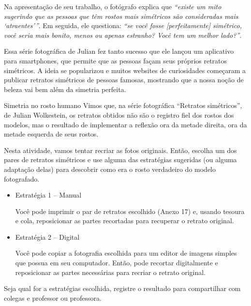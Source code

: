 Na apresentação de seu trabalho, o fotógrafo explica que \textit{“existe um mito sugerindo que as pessoas que têm rostos mais simétricos são consideradas mais ‘atraentes’”}. Em seguida, ele questiona: \textit{“se você fosse [perfeitamente] simétrico, você seria mais bonito, menos ou apenas estranho? Você tem um melhor lado?”}.

Essa série fotográfica de Julian fez tanto sucesso que ele lançou um aplicativo para smartphones, que permite que as pessoas façam seus próprios retratos simétricos. A ideia se popularizou e muitos websites de curiosidades começaram a publicar retratos simétricos de pessoas famosas, mostrando que a nossa noção de beleza vai bem além da simetria perfeita.

\begin{task}{Simetria no rosto humano}
Vimos que, na série fotográfica “Retratos simétricos”, de Julian Wolkestein, os retratos obtidos não são o registro fiel dos rostos dos modelos, mas o resultado de implementar a reflexão ora da metade direita, ora da metade esquerda de seus rostos. 

Nesta atividade, vamos tentar recriar as fotos originais.  Então, escolha um dos pares de retratos simétricos e use alguma das estratégias sugeridas (ou alguma adaptação delas) para descobrir como era o rosto verdadeiro do modelo fotografado. 

\begin{itemize}
\item Estratégia 1 – Manual

Você pode imprimir o par de retratos escolhido (Anexo 17) e, usando tesoura e cola, reposicionar as partes recortadas para recuperar o retrato original. 
\item Estratégia 2 – Digital

Você pode copiar a fotografia escolhida para um editor de imagens simples que possua em seu computador. Então, pode recortar digitalmente e reposicionar as partes necessárias para recriar o retrato original.
\end{itemize}

 
Seja qual for a estratégias escolhida, registre o resultado para compartilhar com colegas e professor ou professora. 
\end{task}

